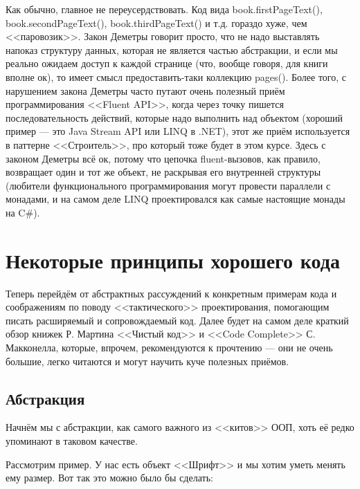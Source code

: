 \documentclass{../text-style}
\begin{document}
Как обычно, главное не переусердствовать. Код вида book.firstPageText(), book.secondPageText(), book.thirdPageText() и т.д. гораздо хуже, чем <<паровозик>>. Закон Деметры говорит просто, что не надо выставлять напоказ структуру данных, которая не является частью абстракции, и если мы реально ожидаем доступ к каждой странице (что, вообще говоря, для книги вполне ок), то имеет смысл предоставить-таки коллекцию pages(). Более того, с нарушением закона Деметры часто путают очень полезный приём программирования <<Fluent API>>, когда через точку пишется последовательность действий, которые надо выполнить над объектом (хороший пример --- это Java Stream API или LINQ в .NET), этот же приём используется в паттерне <<Строитель>>, про который тоже будет в этом курсе. Здесь с законом Деметры всё ок, потому что цепочка fluent-вызовов, как правило, возвращает один и тот же объект, не раскрывая его внутренней структуры (любители функционального программирования могут провести параллели с монадами, и на самом деле LINQ проектировался как самые настоящие монады на C\#).

\section{Некоторые принципы хорошего кода}

Теперь перейдём от абстрактных рассуждений к конкретным примерам кода и соображениям по поводу <<тактического>> проектирования, помогающим писать расширяемый и сопровождаемый код. Далее будет на самом деле краткий обзор книжек Р. Мартина <<Чистый код>> и <<Code Complete>> С. Макконелла, которые, впрочем, рекомендуются к прочтению --- они не очень большие, легко читаются и могут научить куче полезных приёмов.

\subsection{Абстракция}

Начнём мы с абстракции, как самого важного из <<китов>> ООП, хоть её редко упоминают в таковом качестве.

Рассмотрим пример. У нас есть объект <<Шрифт>> и мы хотим уметь менять ему размер. Вот так это можно было бы сделать:
\end{document}
